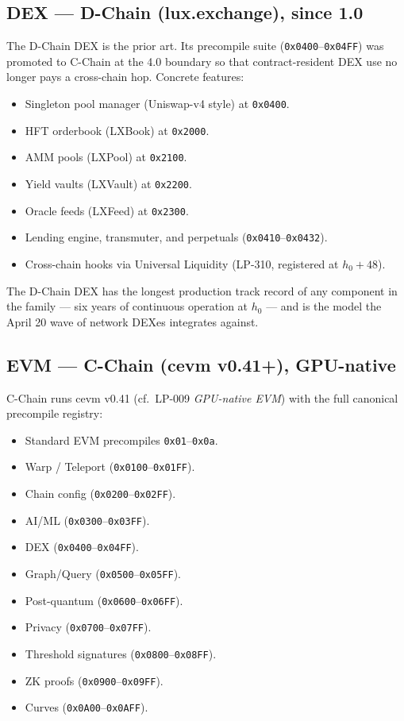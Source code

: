 \documentclass[11pt,a4paper]{article}
\begin{document}
\subsection{DEX --- D-Chain (lux.exchange), since 1.0}

The D-Chain DEX is the prior art. Its precompile suite
(\texttt{0x0400}--\texttt{0x04FF}) was promoted to C-Chain at the 4.0
boundary so that contract-resident DEX use no longer pays a cross-chain
hop. Concrete features:

\begin{itemize}[leftmargin=*]
\item Singleton pool manager (Uniswap-v4 style) at \texttt{0x0400}.
\item HFT orderbook (LXBook) at \texttt{0x2000}.
\item AMM pools (LXPool) at \texttt{0x2100}.
\item Yield vaults (LXVault) at \texttt{0x2200}.
\item Oracle feeds (LXFeed) at \texttt{0x2300}.
\item Lending engine, transmuter, and perpetuals
(\texttt{0x0410}--\texttt{0x0432}).
\item Cross-chain hooks via Universal Liquidity (LP-310, registered
at $h_0 + 48$).
\end{itemize}

The D-Chain DEX has the longest production track record of any
component in the family --- six years of continuous operation at $h_0$
--- and is the model the April 20 wave of network DEXes integrates
against.

\subsection{EVM --- C-Chain (cevm v0.41+), GPU-native}

C-Chain runs cevm v0.41 (cf.\ LP-009 \emph{GPU-native EVM}) with the full
canonical precompile registry:

\begin{itemize}[leftmargin=*]
\item Standard EVM precompiles \texttt{0x01}--\texttt{0x0a}.
\item Warp / Teleport (\texttt{0x0100}--\texttt{0x01FF}).
\item Chain config (\texttt{0x0200}--\texttt{0x02FF}).
\item AI/ML (\texttt{0x0300}--\texttt{0x03FF}).
\item DEX (\texttt{0x0400}--\texttt{0x04FF}).
\item Graph/Query (\texttt{0x0500}--\texttt{0x05FF}).
\item Post-quantum (\texttt{0x0600}--\texttt{0x06FF}).
\item Privacy (\texttt{0x0700}--\texttt{0x07FF}).
\item Threshold signatures (\texttt{0x0800}--\texttt{0x08FF}).
\item ZK proofs (\texttt{0x0900}--\texttt{0x09FF}).
\item Curves (\texttt{0x0A00}--\texttt{0x0AFF}).
\end{itemize}
\end{document}
